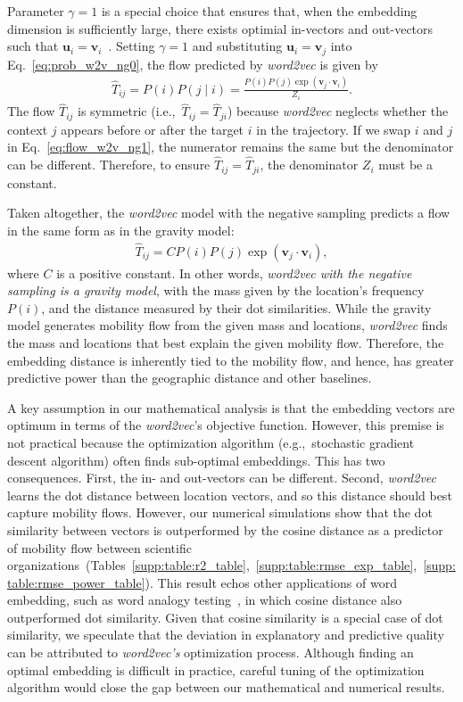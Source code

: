 \documentclass[12pt]{article} %
\def\given{\mid}
\def\eg{e.g.,~}
\def\ie{i.e.,~}
\begin{document}
Parameter $\gamma=1$ is a special choice that ensures that, when the embedding dimension is sufficiently large, there exists optimial in-vectors and out-vectors such that $\bm{u}_i = \bm{v}_i$~\autocite{levy2014neural}.
Setting $\gamma = 1$ and substituting $\bm{u}_i = \bm{v}_j$ into Eq.~\eqref{eq:prob_w2v_ng0}, the flow predicted by {\it word2vec} is given by
\begin{align}
	\hat{T}_{ij}= P(i) P(j\given i) = \frac{P(i)P(j)\exp(\bm{v}_j \cdot \bm{v}_{i})}{Z_i}. \label{eq:flow_w2v_ng1}
\end{align}
The flow $\hat{T}_{ij}$ is symmetric (\ie $\hat{T}_{ij}=\hat{T}_{ji}$) because {\it word2vec} neglects whether the context $j$ appears before or after the target $i$ in the trajectory.
If we swap $i$ and $j$ in Eq.~\eqref{eq:flow_w2v_ng1}, the numerator remains the same but the denominator can be different.
Therefore, to ensure $\hat{T}_{ij} = \hat{T}_{ji}$, the denominator $Z_i$ must be a constant.

Taken altogether, the {\it word2vec} model with the negative sampling predicts a flow in the same form as in the gravity model:
\begin{align}
	\hat{T}_{ij}=  C P(i) P(j)  \exp(\bm{v}_j \cdot \bm{v}_{i}), \label{eq:flow_w2v_ng0}
\end{align}
where $C$ is a positive constant.
In other words, \emph{word2vec with the negative sampling is a gravity model}, with the mass given by the location's frequency $P(i)$, and the distance measured by their dot similarities.
While the gravity model generates mobility flow from the given mass and locations, {\it word2vec} finds the mass and locations that best explain the given mobility flow.
Therefore, the embedding distance is inherently tied to the mobility flow, and hence, has greater predictive power than the geographic distance and other baselines.

A key assumption in our mathematical analysis is that the embedding vectors are optimum in terms of the {\it word2vec}'s objective function.
However, this premise is not practical because the optimization algorithm (\eg stochastic gradient descent algorithm) often finds sub-optimal embeddings.
This has two consequences.
First, the in- and out-vectors can be different.
Second, {\it word2vec} learns the dot distance between location vectors, and so this distance should best capture mobility flows. 
However, our numerical simulations show that the dot similarity between vectors is outperformed by the cosine distance as a predictor of mobility flow between scientific organizations~(Tables~\ref{supp:table:r2_table},~\ref{supp:table:rmse_exp_table},~\ref{supp:table:rmse_power_table}).
This result echos other applications of word embedding, such as word analogy testing~\autocite{levy2015improving}, in which cosine distance also outperformed dot similarity.
Given that cosine similarity is a special case of dot similarity, we speculate that the deviation in explanatory and predictive quality can be attributed to \textit{word2vec's} optimization process.
Although finding an optimal embedding is difficult in practice, careful tuning of the optimization algorithm would close the gap between our mathematical and numerical results.
\end{document}
